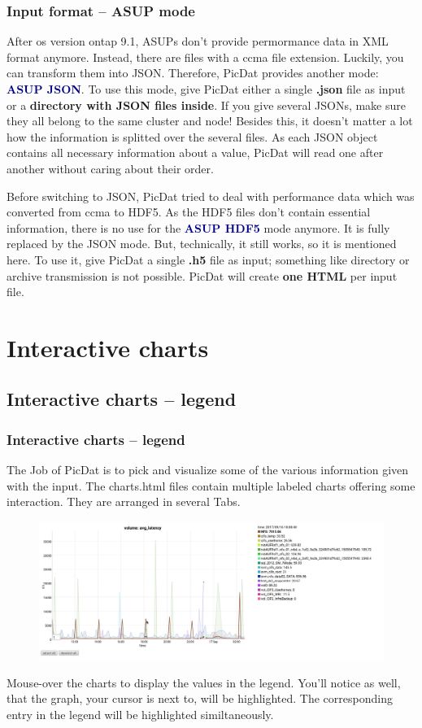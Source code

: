 \documentclass[8pt]{beamer}
\begin{document}
\begin{frame}
\frametitle{Input format -- ASUP mode}
After os version ontap 9.1, ASUPs don't provide permormance data in XML format anymore. Instead, there are files with a ccma file extension. Luckily, you can transform them into JSON. Therefore, PicDat provides another mode: \textcolor{darkblue}{\textbf{ASUP JSON}}. To use this mode, give PicDat either a single \textbf{.json} file as input or a \textbf{directory with JSON files inside}. If you give several JSONs, make sure they all belong to the same cluster and node! Besides this, it doesn't matter a lot how the information is splitted over the several files. As each JSON object contains all necessary information about a value, PicDat will read one after another without caring about their order.
\bigskip

Before switching to JSON, PicDat tried to deal with performance data which was converted from ccma to HDF5. As the HDF5 files don't contain essential information, there is no use for the \textcolor{darkblue}{\textbf{ASUP HDF5}} mode anymore. It is fully replaced by the JSON mode. But, technically, it still works, so it is mentioned here. To use it, give PicDat a single \textbf{.h5} file as input; something like directory or archive transmission is not possible. PicDat will create \textbf{one HTML} per input file. 
\end{frame}

\section{Interactive charts}
\subsection{Interactive charts -- legend}
\begin{frame}
\frametitle{Interactive charts -- legend}
The Job of PicDat is to pick and visualize some of the various information given with the input. The charts.html files contain multiple labeled charts offering some interaction. They are arranged in several Tabs.

\begin{figure}
	\includegraphics[width=\textwidth]{../images/PicDat_highlight2.png}
\end{figure}

Mouse-over the charts to display the values in the legend. You'll notice as well, that the graph, your cursor is next to, will be highlighted. The corresponding entry in the legend will be highlighted similtaneously.
\end{frame}
\end{document}

